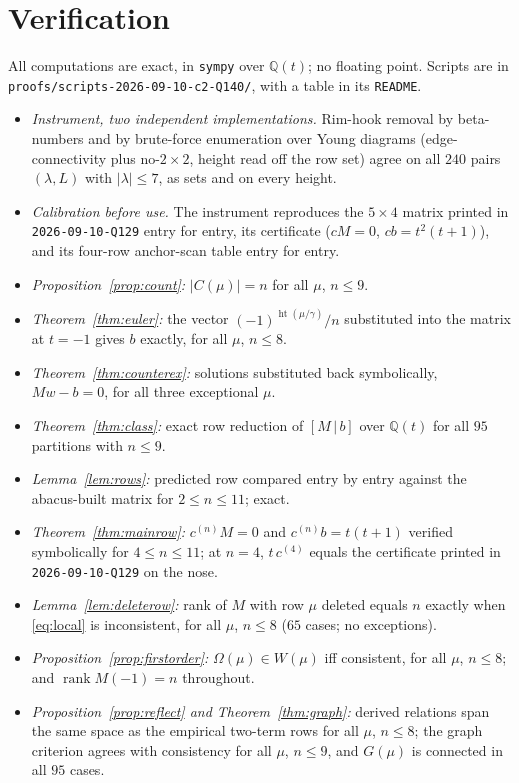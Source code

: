 \documentclass[11pt]{article}
\theoremstyle{definition}
\newcommand{\Q}{\mathbb{Q}}
\newcommand{\hgt}{\operatorname{ht}}      %
\begin{document}
\section{Verification}

All computations are exact, in \texttt{sympy} over $\Q(t)$; no floating point. Scripts are in
\texttt{proofs/scripts-2026-09-10-c2-Q140/}, with a table in its \texttt{README}.

\begin{itemize}
\item \emph{Instrument, two independent implementations.} Rim-hook removal by beta-numbers
and by brute-force enumeration over Young diagrams (edge-connectivity plus no-$2\times2$,
height read off the row set) agree on all $240$ pairs $(\lambda,L)$ with $|\lambda|\le7$,
as sets and on every height.
\item \emph{Calibration before use.} The instrument reproduces the $5\times4$ matrix printed
in \texttt{2026-09-10-Q129} entry for entry, its certificate ($cM=0$, $cb=t^2(t+1)$), and its
four-row anchor-scan table entry for entry.
\item \emph{Proposition~\ref{prop:count}:} $|C(\mu)|=n$ for all $\mu$, $n\le9$.
\item \emph{Theorem~\ref{thm:euler}:} the vector $(-1)^{\hgt(\mu/\gamma)}/n$ substituted into
the matrix at $t=-1$ gives $b$ exactly, for all $\mu$, $n\le8$.
\item \emph{Theorem~\ref{thm:counterex}:} solutions substituted back symbolically,
$Mw-b=0$, for all three exceptional $\mu$.
\item \emph{Theorem~\ref{thm:class}:} exact row reduction of $[M\,|\,b]$ over $\Q(t)$ for all
$95$ partitions with $n\le9$.
\item \emph{Lemma~\ref{lem:rows}:} predicted row compared entry by entry against the
abacus-built matrix for $2\le n\le11$; exact.
\item \emph{Theorem~\ref{thm:mainrow}:} $c^{(n)}M=0$ and $c^{(n)}b=t(t+1)$ verified
symbolically for $4\le n\le11$; at $n=4$, $t\,c^{(4)}$ equals the certificate printed in
\texttt{2026-09-10-Q129} on the nose.
\item \emph{Lemma~\ref{lem:deleterow}:} rank of $M$ with row $\mu$ deleted equals $n$ exactly
when \eqref{eq:local} is inconsistent, for all $\mu$, $n\le8$ ($65$ cases; no exceptions).
\item \emph{Proposition~\ref{prop:firstorder}:} $\Omega(\mu)\in W(\mu)$ iff consistent, for
all $\mu$, $n\le8$; and $\operatorname{rank}M(-1)=n$ throughout.
\item \emph{Proposition~\ref{prop:reflect} and Theorem~\ref{thm:graph}:} derived relations
span the same space as the empirical two-term rows for all $\mu$, $n\le8$; the graph
criterion agrees with consistency for all $\mu$, $n\le9$, and $G(\mu)$ is connected in all
$95$ cases.
\end{itemize}
\end{document}
